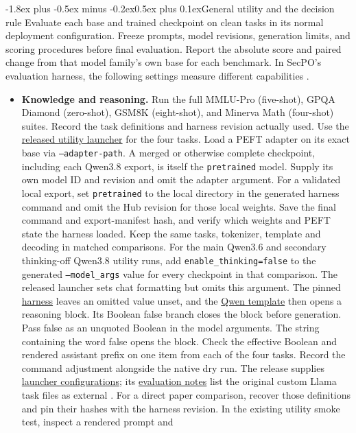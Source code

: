 \documentclass[11pt]{article}
\makeatletter
\renewcommand\subsection{\@startsection{subsection}{2}{\z@}%
  {-1.8ex plus -0.5ex minus -0.2ex}{0.5ex plus 0.1ex}{\normalfont\large\bfseries}}
\makeatother
\begin{document}
\subsection{General utility and the decision rule}
Evaluate each base and trained checkpoint on clean tasks in its normal deployment configuration. Freeze prompts, model revisions, generation limits, and scoring procedures before final evaluation. Report the absolute score and paired change from that model family's own base for each benchmark. In SecPO's evaluation harness, the following settings measure different capabilities \cite[App.~B.3]{chen2026secpo}.

\begin{itemize}
\item \textbf{Knowledge and reasoning.} Run the full MMLU-Pro (five-shot), GPQA Diamond (zero-shot), GSM8K (eight-shot), and Minerva Math (four-shot) suites. Record the task definitions and harness revision actually used. Use the \href{https://github.com/Sizhe-Chen/SecPO/blob/da0372a0e598badf4e51c98c175a962147cac2ac/src/secpo/evaluation/lm_eval_utility.py}{released utility launcher} for the four tasks. Load a PEFT adapter on its exact base via \texttt{--adapter-path}. A merged or otherwise complete checkpoint, including each Qwen3.8 export, is itself the \texttt{pretrained} model. Supply its own model ID and revision and omit the adapter argument. For a validated local export, set \texttt{pretrained} to the local directory in the generated harness command and omit the Hub revision for those local weights. Save the final command and export-manifest hash, and verify which weights and PEFT state the harness loaded. Keep the same tasks, tokenizer, template and decoding in matched comparisons. For the main Qwen3.6 and secondary thinking-off Qwen3.8 utility runs, add \texttt{enable\_thinking=false} to the generated \texttt{--model\_args} value for every checkpoint in that comparison. The released launcher sets chat formatting but omits this argument. The pinned \href{https://github.com/EleutherAI/lm-evaluation-harness/blob/d6de81643928d653435c431bae19945d41d32520/lm_eval/models/huggingface.py}{harness} leaves an omitted value unset, and the \href{https://huggingface.co/Qwen/Qwen3.6-27B/blob/6a9e13bd6fc8f0983b9b99948120bc37f49c13e9/chat_template.jinja}{Qwen template} then opens a reasoning block. Its Boolean false branch closes the block before generation. Pass false as an unquoted Boolean in the model arguments. The string containing the word false opens the block. Check the effective Boolean and rendered assistant prefix on one item from each of the four tasks. Record the command adjustment alongside the native dry run. The release supplies \href{https://github.com/Sizhe-Chen/SecPO/blob/da0372a0e598badf4e51c98c175a962147cac2ac/configs/evaluate_lm_eval_llama31_8b.json}{launcher configurations}; its \href{https://github.com/Sizhe-Chen/SecPO/blob/da0372a0e598badf4e51c98c175a962147cac2ac/docs/EVALUATION.md#utility-evaluation}{evaluation notes} list the original custom Llama task files as external \cite{secpocode}. For a direct paper comparison, recover those definitions and pin their hashes with the harness revision. In the existing utility smoke test, inspect a rendered prompt and 
\end{itemize}
\end{document}
